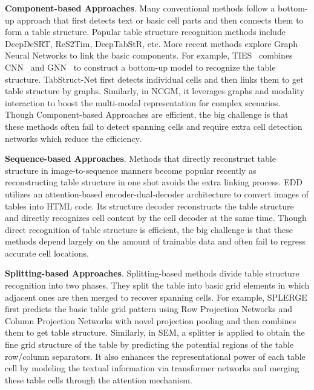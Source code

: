 \documentclass[lettersize,journal]{IEEEtran}
\begin{document}
\textbf{Component-based Approaches}. Many conventional methods follow a bottom-up approach that first detects text or basic cell parts and then connects them to form a table structure. Popular table structure recognition methods include DeepDeSRT\cite{schreiber2017deepdesrt}, ReS2Tim\cite{xue2019res2tim}, DeepTabStR\cite{siddiqui2019deeptabstr}, etc. More recent methods explore Graph Neural Networks to link the basic components. For example, TIES~\cite{qasim2019rethinking} combines CNN~\cite{krizhevsky2012imagenet} and GNN~\cite{scarselli2008graph} to construct a bottom-up model to recognize the table structure. TabStruct-Net\cite{raja2020table} first detects individual cells and then links them to get table structure by graphs. Similarly, in NCGM\cite{liu2021neural}, it leverages graphs and modality interaction to boost the multi-modal representation for complex scenarios. Though Component-based Approaches are efficient, the big challenge is that these methods often fail to detect spanning cells and require extra cell detection networks which reduce the efficiency.

\textbf{Sequence-based Approaches}. Methods that directly reconstruct table structure in image-to-sequence manners become popular recently as reconstructing table structure in one shot avoids the extra linking process. EDD\cite{zhong2020image} utilizes an attention-based encoder-dual-decoder architecture to convert images of tables into HTML code. Its structure decoder reconstructs the table structure and directly recognizes cell content by the cell decoder at the same time. Though direct recognition of table structure is efficient, the big challenge is that these methods depend largely on the amount of trainable data and often fail to regress accurate cell locations.


\textbf{Splitting-based Approaches}. Splitting-based methods divide table structure recognition into two phases. They split the table into basic grid elements in which adjacent ones are then merged to recover spanning cells. For example, SPLERGE\cite{tensmeyer2019deep} first predicts the basic table grid pattern using Row Projection Networks and Column Projection Networks with novel projection pooling and then combines them to get table structure. Similarly, in SEM\cite{zhang2022split}, a splitter is applied to obtain the fine grid structure of the table by predicting the potential regions of the table row/column separators. It also enhances the representational power of each table cell by modeling the textual information via transformer networks and merging these table cells through the attention mechanism.
\end{document}
